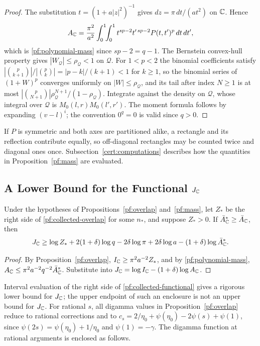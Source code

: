 \begin{proof}
The substitution $t=(1+a|z|^2)^{-1}$ gives $dz=\pi\,dt/(at^2)$ on $\mathbb C$.
Hence
\[
 A_\mathbb C=\frac{\pi^2}{a^2}\int_0^1\!\!\int_0^1t^{sp-2}t'^{\,sp-2}
 P(t,t')^p\,dt\,dt',
\]
which is \eqref{pf:polynomial-mass} since $sp-2=q-1$. The Bernstein
convex-hull property gives $|W_{\mathcal Q}|\le\rho_{\mathcal Q}<1$ on
$\mathcal Q$. For $1<p<2$ the binomial coefficients satisfy
$|\binom p{k+1}|/|\binom pk|=|p-k|/(k+1)<1$ for $k\ge1$, so the binomial
series of $(1+W)^p$ converges uniformly on $|W|\le\rho_{\mathcal Q}$,
and its tail after index $N\ge1$ is at most
$|\binom p{N+1}|\rho_{\mathcal Q}^{N+1}/(1-\rho_{\mathcal Q})$.
Integrate against the density on $\mathcal Q$, whose integral over
$\mathcal Q$ is $M_0(l,r)M_0(l',r')$. The moment formula follows by expanding
$(v-l)^i$; the convention $0^q=0$ is valid since $q>0$.
\end{proof}

If $P$ is symmetric and both axes are partitioned alike, a rectangle and
its reflection contribute equally, so off-diagonal rectangles may be
counted twice and diagonal ones once. Subsection~\ref{cert:computations}
describes how the quantities in Proposition~\ref{pf:mass} are evaluated.

\subsection{\texorpdfstring{A Lower Bound for the Functional $J_\mathbb C$}{A Lower Bound for the Functional}}

\begin{corollary}\label{pf:functional}
Under the hypotheses of Propositions~\ref{pf:overlap} and~\ref{pf:mass},
let $Z_*$ be the right side of \eqref{pf:collected-overlap} for some
$n_*$, and suppose $Z_*>0$. If $\bar A_\mathbb C^*\ge\bar A_\mathbb C$, then
\begin{equation}\label{pf:collected-functional}
 J_\mathbb C\ge\log Z_*+2(1+\delta)\log q-2\delta\log\pi
 +2\delta\log a-(1+\delta)\log\bar A_\mathbb C^* .
\end{equation}
\end{corollary}

\begin{proof}
By Proposition~\ref{pf:overlap}, $I_\mathbb C\ge\pi^2a^{-2}Z_*$, and by
\eqref{pf:polynomial-mass}, $A_\mathbb C\le\pi^2a^{-2}q^{-2}\bar A_\mathbb C^*$.
Substitute into $J_\mathbb C=\log I_\mathbb C-(1+\delta)\log A_\mathbb C$.
\end{proof}

Interval evaluation of the right side of \eqref{pf:collected-functional}
gives a rigorous lower bound for $J_\mathbb C$; the upper endpoint of such an
enclosure is not an upper bound for $J_\mathbb C$. For rational $s$, all
digamma values in Proposition~\ref{pf:overlap} reduce to rational
corrections and to $c_s=2/\eta_0+\psi(\eta_0)-2\psi(s)+\psi(1)$, since
$\psi(2s)=\psi(\eta_0)+1/\eta_0$ and $\psi(1)=-\gamma$. The digamma
function at rational arguments is enclosed as follows.

